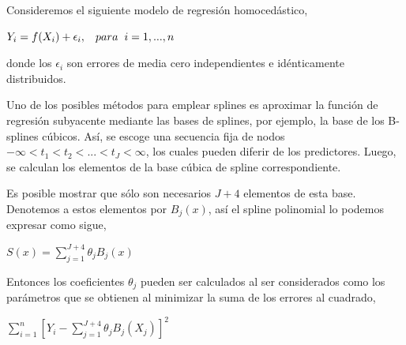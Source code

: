 \hspace{0.4cm} Consideremos el siguiente modelo de regresi\'on homoced\'astico,\\

\begin{center}

$\displaystyle{Y_{i}=f(X_{i})+\epsilon_{i}}, \hspace{0.3cm} para \hspace{0.2cm} i=1,...,n$
\end{center}

\vspace{0.2cm}

\noindent donde los $\epsilon_{i}$ son errores de media cero independientes e id\'enticamente distribuidos.


\hspace{0.4cm} Uno de los posibles m\'etodos para emplear splines es aproximar la funci\'on de regresi\'on subyacente mediante las bases de splines, por ejemplo, la base de los B-splines c\'ubicos. As\'i, se escoge una secuencia fija de nodos $-\infty<t_{1}<t_{2}<...<t_{J}<\infty$, los cuales pueden diferir de los predictores. Luego, se calculan los elementos de la base c\'ubica de spline correspondiente.


\hspace{0.4cm}Es posible mostrar que s\'olo son necesarios $J+4$ elementos de esta base. Denotemos a estos elementos por $B_{j}(x)$, as\'i el spline polinomial lo podemos expresar como sigue,

\vspace{0.2cm}


\begin{center}

$\displaystyle{S(x)=\sum_{j=1}^{J+4} \theta_{j}B_{j}(x)}$
\end{center}

\vspace{0.2cm}

\hspace{0.4cm}Entonces los coeficientes $\theta_{j}$ pueden ser calculados al ser considerados como los par\'ametros que se obtienen al minimizar la suma de los errores al cuadrado,

\vspace{0.2cm}


\begin{center}
$\displaystyle{\sum_{i=1}^{n} \left[ Y_{i} - \sum_{j=1}^{J+4} \theta_{j}B_{j}(X_{j})\right]^2}$
\end{center}


